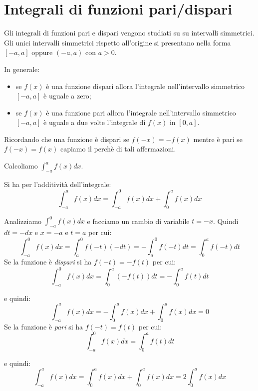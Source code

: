 \section{Integrali di funzioni pari/dispari}
Gli integrali di funzioni pari e dispari vengono studiati su su intervalli simmetrici. Gli unici intervalli simmetrici rispetto all'origine si presentano nella forma $[-a,a]$ oppure $(-a,a)$ con $a>0$.

In generale:
\begin{itemize}
    \item se $f(x)$ è una funzione dispari allora l'integrale nell'intervallo simmetrico $[-a,a]$ è uguale a zero;
    \item se $f(x)$ è una funzione pari allora l'integrale nell'intervallo simmetrico $[-a,a]$ è uguale a due volte l'integrale di $f(x)$ in $[0,a]$.
\end{itemize}

Ricordando che una funzione è dispari se $f(-x)=-f(x)$ mentre è pari se $f(-x)=f(x)$ capiamo il perchè di tali affermazioni.

Calcoliamo $\int^a_{-a}f(x)dx$.

Si ha per l'additività dell'integrale:
\begin{equation*}\int^a_{-a}f(x)dx=\int^0_{-a}f(x)dx+\int^a_0f(x)dx\end{equation*}

Analizziamo $\int^0_{-a}f(x)dx$ e facciamo un cambio di variabile $t=-x$. Quindi $dt=-dx$ e $x=-a$ e $t=a$ per cui:
\begin{equation*}\int^0_{-a}f(x)dx=\int_a^0f(-t)(-dt)=-\int_a^0f(-t)dt=\int^a_0f(-t)dt\end{equation*}
Se la funzione è \textit{dispari} si ha $f(-t)=-f(t)$ per cui:
\begin{equation*}
    \int^0_{-a}f(x)dx=\int^a_0(-f(t))dt=-\int^a_0f(t)dt
\end{equation*}

e quindi:
\begin{equation*}
    \int^a_{-a}f(x)dx=-\int^a_0f(x)dx+\int^a_0f(x)dx=0
\end{equation*}
Se la funzione è \textit{pari} si ha $f(-t)=f(t)$ per cui:
\begin{equation*}
    \int^0_{-a}f(x)dx=\int^a_0f(t)dt
\end{equation*}

e quindi:
\begin{equation*}
    \int^a_{-a}f(x)dx=\int^a_0f(x)dx+\int^a_0f(x)dx=2\int^a_0f(x)dx    
\end{equation*}

